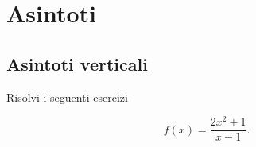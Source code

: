 \chapter{Asintoti}
\section{Asintoti verticali}
Risolvi i seguenti esercizi
\tcbstartrecording


\begin{exercise}[no solution]
	
	\begin{equation*}
	f(x)= \frac{2x^2+1}{x-1}.
	\end{equation*}
\end{exercise}
